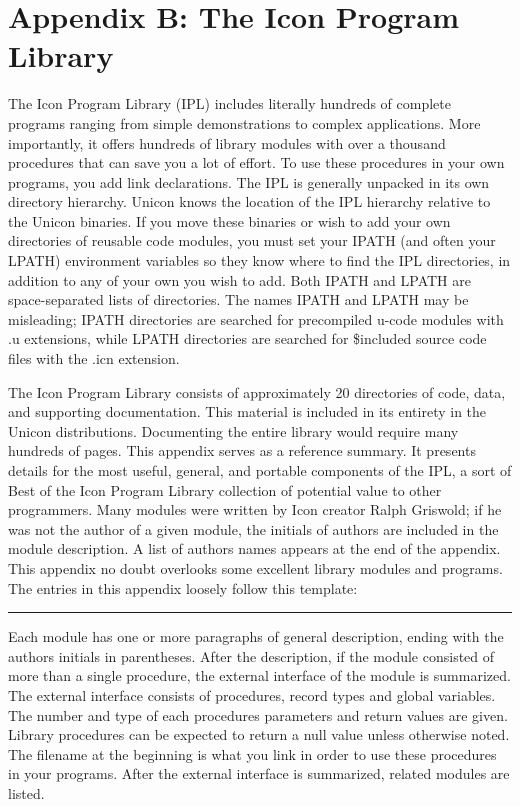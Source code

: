 \clearpage\section{Appendix B: The Icon Program Library}

The Icon Program Library (IPL) includes
literally hundreds of complete programs ranging from simple
demonstrations to complex applications. More importantly, it offers
hundreds of library modules with over a thousand procedures that can
save you a lot of effort. To use these procedures in your own programs,
you add link declarations. The IPL is generally unpacked in
its own directory hierarchy. Unicon knows the location of the IPL
hierarchy relative to the Unicon binaries. If you move these binaries
or wish to add your own directories of reusable code modules, you must
set your IPATH (and often your LPATH)
environment variables so they know
where to find the IPL directories, in addition to any of your own you
wish to add. Both IPATH and LPATH are space-separated lists of
directories. The names IPATH and LPATH may be misleading; IPATH
directories are searched for precompiled u-code modules with .u
extensions, while LPATH directories are searched for
\$include{\textquotesingle}d source code files with
the .icn extension.

The Icon Program Library consists of approximately 20
directories of code, data, and supporting documentation. This material
is included in its entirety in the Unicon distributions. Documenting
the entire library would require many hundreds of pages.
This appendix serves as a reference summary. It presents details for
the most useful, general,
and portable components of the IPL, a sort of
{\textquotedbl}Best of the Icon Program
Library{\textquotedbl} collection of potential value to other programmers.
Many modules were written by Icon creator Ralph Griswold; if he was not
the author of a given module,
the initials of authors are included in the module description. A list of
authors{\textquotesingle} names appears at the end of the appendix. This
appendix no doubt overlooks some excellent library modules and programs.
The entries in this appendix loosely follow this template:

\vspace{0.25cm}\hrule{}

Each module has one or more paragraphs of general description, ending
with the authors{\textquotesingle} initials in parentheses. After the
description, if the module consisted of more than a single procedure,
the external interface of the module is summarized. The external
interface consists of procedures, record types and global variables.
The number and type of each procedure{\textquotesingle}s parameters and
return values are given. Library procedures can be expected to return a
null value unless otherwise noted. The filename at the beginning is
what you link in order to use these procedures in your
programs. After the external interface is summarized, related modules
are listed.

